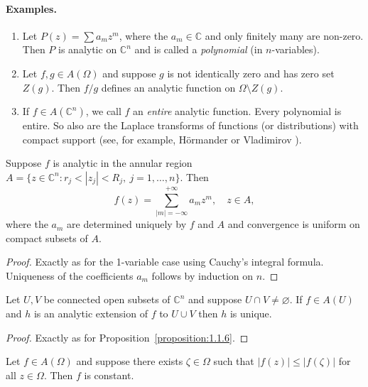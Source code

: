 \paragraph*{Examples.}
\begin{enumerate}
\item Let $P(z)=\sum a_mz^m$, where the $a_m\in\mathbb C$ and only finitely many are non-zero. Then $P$ is analytic on $\mathbb C^n$ and is called a \emph{polynomial} (in $n$-variables).
\item Let $f,g\in A(\Omega)$ and suppose $g$ is not identically zero and has zero set $Z(g)$. Then $f/g$ defines an analytic function on $\Omega\setminus Z(g)$.
\item If $f\in A(\mathbb C^n)$, we call $f$ an \emph{entire} analytic function. Every polynomial is entire. So also are the Laplace transforms of functions
(or distributions) with compact support (see, for example, H\"ormander \cite{bib:I:hormander-l:2} or Vladimirov \cite{bib:I:vladimirov-v-s:2}).
\end{enumerate}
 Suppose $f$ is analytic in the annular region $A=\{z\in\mathbb C^n:r_j<|z_j|<R_j,\ j=1,\ldots,n\}$. Then
\[f(z)=\sum_{|m|=-\infty}^{+\infty}a_mz^m,\quad z\in A,\]
where the $a_m$ are determined uniquely by $f$ and $A$ and convergence is uniform on compact subsets of $A$.
\begin{proof}
Exactly as for the 1-variable case using Cauchy's integral formula. Uniqueness of the coefficients $a_m$ follows by induction on $n$.
\end{proof}
 Let $U,V$ be connected open subsets of $\mathbb C^n$ and suppose $U\cap V\neq\varnothing$. If $f\in A(U)$ and $h$ is an analytic extension of $f$ to $U\cup V$ then $h$ is unique.
\begin{proof}
Exactly as for Proposition~\ref{proposition:1.1.6}.
\end{proof}
 Let $f\in A(\Omega)$ and suppose there exists $\zeta\in\Omega$ such that $|f(z)|\leq|f(\zeta)|$ for all $z\in\Omega$. Then $f$ is constant.
